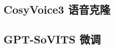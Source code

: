 \documentclass[12pt,a4paper]{article}
\begin{document}
%
%

\subsection{CosyVoice3 语音克隆}
\label{sec:cosyvoice}

%
%

\subsection{GPT-SoVITS 微调}
\label{sec:gptsovits}

%
%
\end{document}
